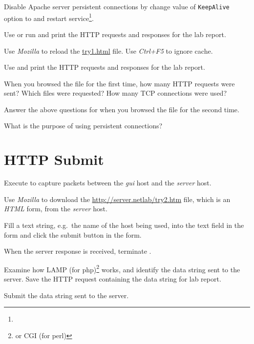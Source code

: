 \documentclass{../UTNetLab}
\begin{document}
Disable Apache server persistent connections by change value of \texttt{KeepAlive} option to  and restart  service\footnote{}.


Use  or run  and print the HTTP requests and responses for the lab report.

Use \textit{Mozilla} to reload the \url{try1.html} file.
Use \textit{Ctrl+F5} to ignore cache.

Use  and print the HTTP requests and responses for the lab report.

\begin{report}
    \item When you browsed the  file for the first time, how many HTTP requests were sent?
    Which files were requested?
    How many TCP connections were used?

    \item Answer the above questions for when you browsed the  file for the second time.

    \item What is the purpose of using persistent connections?
\end{report}

\section{HTTP Submit}
Execute  to capture packets between the \textit{gui} host and the \textit{server} host.

Use \textit{Mozilla} to download the \url{http://server.netlab/try2.htm} file, which is an \textit{HTML} form, from the \textit{server} host.

Fill a text string, e.g.\ the name of the host being used, into the text field in the form and click the submit button in the form.

When the server response is received, terminate .

Examine how LAMP (for php)\footnote{or CGI (for perl)} works, and identify the data string sent to the server.
Save the HTTP request containing the data string for lab report.

\begin{report}
    \item Submit the data string sent to the server.
\end{report}
\end{document}
